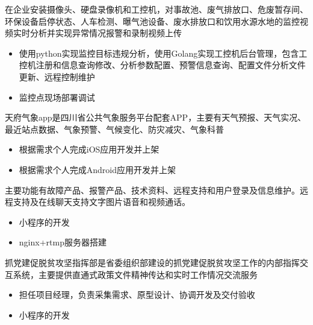 \documentclass{resume}
\begin{document}
\begin{onehalfspacing}
在企业安装摄像头、硬盘录像机和工控机，对事故池、废气排放口、危废暂存间、环保设备启停状态、人车检测、曝气池设备、废水排放口和饮用水源水地的监控视频实时分析并实现异常情况报警和录制视频上传
\begin{itemize}
  \item 使用python实现监控目标违规分析，使用Golang实现工控机后台管理，包含工控机注册和信息查询修改、分析参数配置、预警信息查询、配置文件分析文件更新、远程控制维护
  \item 监控点现场部署调试
\end{itemize}
\end{onehalfspacing}

\begin{onehalfspacing}
天府气象app是四川省公共气象服务平台配套APP，主要有天气预报、天气实况、最近站点数据、气象预警、气候变化、防灾减灾、气象科普
\begin{itemize}
  \item 根据需求个人完成iOS应用开发并上架
  \item 根据需求个人完成Android应用开发并上架
\end{itemize}
\end{onehalfspacing}

\begin{onehalfspacing}
主要功能有故障产品、报警产品、技术资料、远程支持和用户登录及信息维护。远程支持及在线聊天支持文字图片语音和视频通话。
\begin{itemize}
  \item 小程序的开发
  \item nginx+rtmp服务器搭建
\end{itemize}
\end{onehalfspacing}


\begin{onehalfspacing}
抓党建促脱贫攻坚指挥部是省委组织部建设的抓党建促脱贫攻坚工作的内部指挥交互系统，主要提供直通式政策文件精神传达和实时工作情况交流服务
\begin{itemize}
  \item 担任项目经理，负责采集需求、原型设计、协调开发及交付验收
  \item 小程序的开发
\end{itemize}
\end{onehalfspacing}
\end{document}
